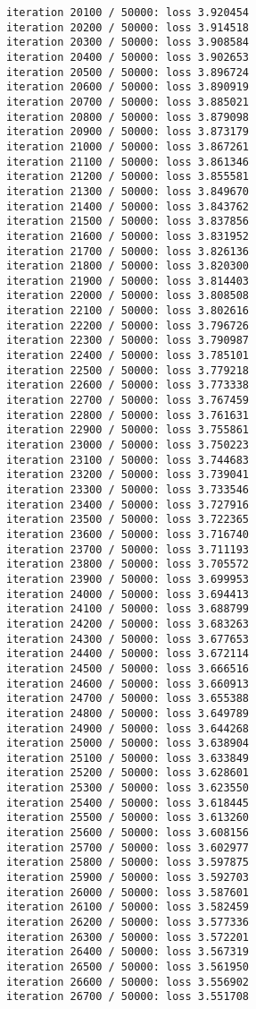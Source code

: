 \documentclass[11pt]{article}
\begin{document}
\begin{Verbatim}[commandchars=\\\{\}]
iteration 20100 / 50000: loss 3.920454
iteration 20200 / 50000: loss 3.914518
iteration 20300 / 50000: loss 3.908584
iteration 20400 / 50000: loss 3.902653
iteration 20500 / 50000: loss 3.896724
iteration 20600 / 50000: loss 3.890919
iteration 20700 / 50000: loss 3.885021
iteration 20800 / 50000: loss 3.879098
iteration 20900 / 50000: loss 3.873179
iteration 21000 / 50000: loss 3.867261
iteration 21100 / 50000: loss 3.861346
iteration 21200 / 50000: loss 3.855581
iteration 21300 / 50000: loss 3.849670
iteration 21400 / 50000: loss 3.843762
iteration 21500 / 50000: loss 3.837856
iteration 21600 / 50000: loss 3.831952
iteration 21700 / 50000: loss 3.826136
iteration 21800 / 50000: loss 3.820300
iteration 21900 / 50000: loss 3.814403
iteration 22000 / 50000: loss 3.808508
iteration 22100 / 50000: loss 3.802616
iteration 22200 / 50000: loss 3.796726
iteration 22300 / 50000: loss 3.790987
iteration 22400 / 50000: loss 3.785101
iteration 22500 / 50000: loss 3.779218
iteration 22600 / 50000: loss 3.773338
iteration 22700 / 50000: loss 3.767459
iteration 22800 / 50000: loss 3.761631
iteration 22900 / 50000: loss 3.755861
iteration 23000 / 50000: loss 3.750223
iteration 23100 / 50000: loss 3.744683
iteration 23200 / 50000: loss 3.739041
iteration 23300 / 50000: loss 3.733546
iteration 23400 / 50000: loss 3.727916
iteration 23500 / 50000: loss 3.722365
iteration 23600 / 50000: loss 3.716740
iteration 23700 / 50000: loss 3.711193
iteration 23800 / 50000: loss 3.705572
iteration 23900 / 50000: loss 3.699953
iteration 24000 / 50000: loss 3.694413
iteration 24100 / 50000: loss 3.688799
iteration 24200 / 50000: loss 3.683263
iteration 24300 / 50000: loss 3.677653
iteration 24400 / 50000: loss 3.672114
iteration 24500 / 50000: loss 3.666516
iteration 24600 / 50000: loss 3.660913
iteration 24700 / 50000: loss 3.655388
iteration 24800 / 50000: loss 3.649789
iteration 24900 / 50000: loss 3.644268
iteration 25000 / 50000: loss 3.638904
iteration 25100 / 50000: loss 3.633849
iteration 25200 / 50000: loss 3.628601
iteration 25300 / 50000: loss 3.623550
iteration 25400 / 50000: loss 3.618445
iteration 25500 / 50000: loss 3.613260
iteration 25600 / 50000: loss 3.608156
iteration 25700 / 50000: loss 3.602977
iteration 25800 / 50000: loss 3.597875
iteration 25900 / 50000: loss 3.592703
iteration 26000 / 50000: loss 3.587601
iteration 26100 / 50000: loss 3.582459
iteration 26200 / 50000: loss 3.577336
iteration 26300 / 50000: loss 3.572201
iteration 26400 / 50000: loss 3.567319
iteration 26500 / 50000: loss 3.561950
iteration 26600 / 50000: loss 3.556902
iteration 26700 / 50000: loss 3.551708

\end{Verbatim}
\end{document}
